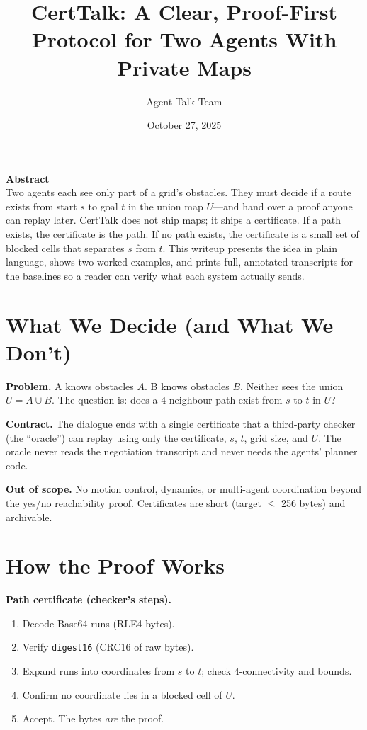 \documentclass[11pt]{article}
\title{CertTalk: A Clear, Proof-First Protocol for Two Agents With Private Maps}
\author{Agent Talk Team}
\date{October 27, 2025}
\begin{document}
\maketitle

\textbf{Abstract}\\
Two agents each see only part of a grid’s obstacles. They must decide if a route exists from start $s$ to goal $t$ in the union map $U$—and hand over a proof anyone can replay later. CertTalk does not ship maps; it ships a certificate. If a path exists, the certificate is the path. If no path exists, the certificate is a small set of blocked cells that separates $s$ from $t$. This writeup presents the idea in plain language, shows two worked examples, and prints full, annotated transcripts for the baselines so a reader can verify what each system actually sends.

\section{What We Decide (and What We Don’t)}
\textbf{Problem.} A knows obstacles $A$. B knows obstacles $B$. Neither sees the union $U = A\cup B$. The question is: does a 4-neighbour path exist from $s$ to $t$ in $U$?

\textbf{Contract.} The dialogue ends with a single certificate that a third-party checker (the “oracle”) can replay using only the certificate, $s$, $t$, grid size, and $U$. The oracle never reads the negotiation transcript and never needs the agents’ planner code.

\textbf{Out of scope.} No motion control, dynamics, or multi-agent coordination beyond the yes/no reachability proof. Certificates are short (target $\le$ 256 bytes) and archivable.

\section{How the Proof Works}
\textbf{Path certificate (checker’s steps).}
\begin{enumerate}
  \item Decode Base64 runs (RLE4 bytes).\label{step:path-decode}
  \item Verify \texttt{digest16} (CRC16 of raw bytes).\label{step:path-crc}
  \item Expand runs into coordinates from $s$ to $t$; check 4-connectivity and bounds.\label{step:path-expand}
  \item Confirm no coordinate lies in a blocked cell of $U$.\label{step:path-free}
  \item Accept. The bytes \emph{are} the proof.
\end{enumerate}
\end{document}
